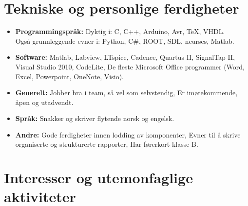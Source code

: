 \documentclass[11pt,a4paper,sans,norsk]{moderncv}        %
\begin{document}
\section{Tekniske og personlige ferdigheter}

\vspace{6pt}

\begin{itemize}

\item \textbf{Programmingspråk:} Dyktig i: C, C++, Arduino, Avr, TeX, VHDL. \\ Også grunnleggende evner i: Python, C\#, ROOT, SDL, ncurses, Matlab.

\vspace{6pt}

\item \textbf{Software:} Matlab, Labview, LTspice, Cadence, Quartus II, SignalTap II, Visual Studio 2010, CodeLite, De fleste Microsoft Office programmer (Word, Excel, Powerpoint, OneNote, Visio).

\vspace{6pt}

\item \textbf{Generelt:} Jobber bra i team, så vel som selvstendig, Er imøtekommende, åpen og utadvendt.

\vspace{6pt}

\item \textbf{Språk:} Snakker og skriver flytende norsk og engelsk.

\vspace{6pt}

\item \textbf{Andre:} Gode ferdigheter innen lodding av komponenter, Evner til å skrive organiserte og strukturerte rapporter, Har førerkort klasse B.

\end{itemize}

\newpage

\section{Interesser og utemonfaglige aktiviteter}

\vspace{6pt}
\end{document}
